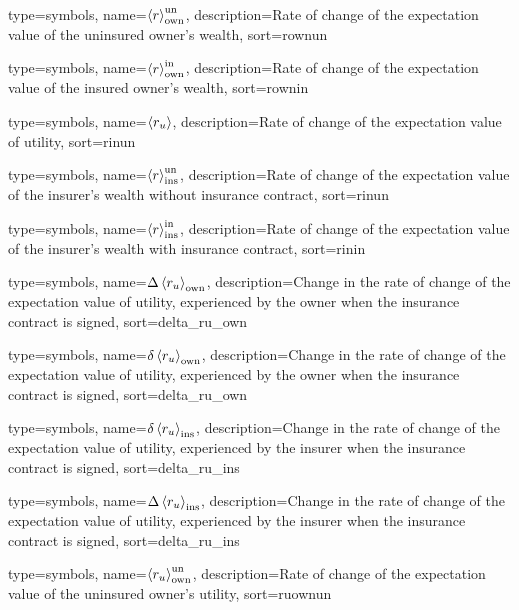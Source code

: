 {
  type={symbols}, 
  name={\ensuremath{\ave{r}_{\text{own}}^{\text{un}}}},
  description={Rate of change of the expectation value of the uninsured owner's wealth},
  sort=rownun
}

{
  type={symbols}, 
  name={\ensuremath{\ave{r}_{\text{own}}^{\text{in}}}},
  description={Rate of change of the expectation value of the insured owner's wealth},
  sort=rownin
}

{
  type={symbols}, 
  name={\ensuremath{\ave{r_u}}},
  description={Rate of change of the expectation value of utility},
  sort=rinun
}

{
  type={symbols}, 
  name={\ensuremath{\ave{r}_{\text{ins}}^{\text{un}}}},
  description={Rate of change of the expectation value of the insurer's wealth without insurance contract},
  sort=rinun
}

{
  type={symbols}, 
  name={\ensuremath{\ave{r}_{\text{ins}}^{\text{in}}}},
  description={Rate of change of the expectation value of the insurer's wealth with insurance contract},
  sort=rinin
}






{
 type={symbols}, 
 name={\ensuremath{\Delta \ave{r_u}_{\text{own}}}},
 description={Change in the rate of change of the expectation value of utility, experienced by the owner when the insurance contract is signed},
 sort=delta_ru_own
}

{
 type={symbols}, 
 name={\ensuremath{\delta \ave{r_u}_{\text{own}}}},
 description={Change in the rate of change of the expectation value of utility, experienced by the owner when the insurance contract is signed},
 sort=delta_ru_own
}

{
 type={symbols}, 
 name={\ensuremath{\delta \ave{r_u}_{\text{ins}}}},
 description={Change in the rate of change of the expectation value of utility, experienced by the insurer when the insurance contract is signed},
 sort=delta_ru_ins
}

{
 type={symbols}, 
 name={\ensuremath{\Delta \ave{r_u}_{\text{ins}}}},
 description={Change in the rate of change of the expectation value of utility, experienced by the insurer when the insurance contract is signed},
 sort=delta_ru_ins
}

{
  type={symbols}, 
  name={\ensuremath{\ave{r_u}_{\text{own}}^{\text{un}}}},
  description={Rate of change of the expectation value of the uninsured owner's utility},
  sort=ruownun
}

